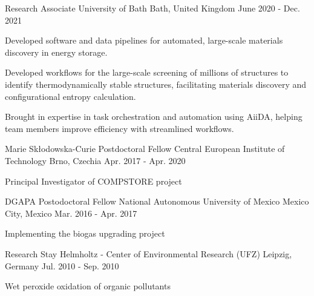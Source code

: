 \begin{cventries}
  \cventry
  {Research Associate } %
  {University of Bath } %
  {Bath, United Kingdom} %
  {June 2020 - Dec. 2021} %
  {
    \begin{cvitems} %
    \item{Developed software and data pipelines for automated, large-scale materials discovery in energy storage.}
    \item{Developed workflows for the large-scale screening of millions of structures to identify thermodynamically stable structures, facilitating materials discovery and configurational entropy calculation.}
    \item{Brought in expertise in task orchestration and automation using AiiDA, helping team members improve efficiency with streamlined workflows.}
    \end{cvitems}
  }

  \cventry
  {Marie Skłodowska-Curie Postdoctoral Fellow} %
  {Central European Institute of Technology } %
  {Brno, Czechia} %
  {Apr. 2017 - Apr. 2020} %
  {
    \begin{cvitems} %
    \item {Principal Investigator of COMPSTORE project}
    \end{cvitems}
  }

  \cventry
  {DGAPA Postodoctoral Fellow} %
  {National Autonomous University of Mexico } %
  {Mexico City, Mexico} %
  {Mar. 2016 - Apr. 2017} %
  {
    \begin{cvitems} %
    \item {Implementing the biogas upgrading project}
    \end{cvitems}
  }

  \cventry
  {Research Stay} %
  {Helmholtz - Center of Environmental Research (UFZ)} %
  {Leipzig, Germany} %
  {Jul. 2010 - Sep. 2010} %
  {
    \begin{cvitems} %
    \item {Wet peroxide oxidation of organic pollutants}
    \end{cvitems}
  }


\end{cventries}
